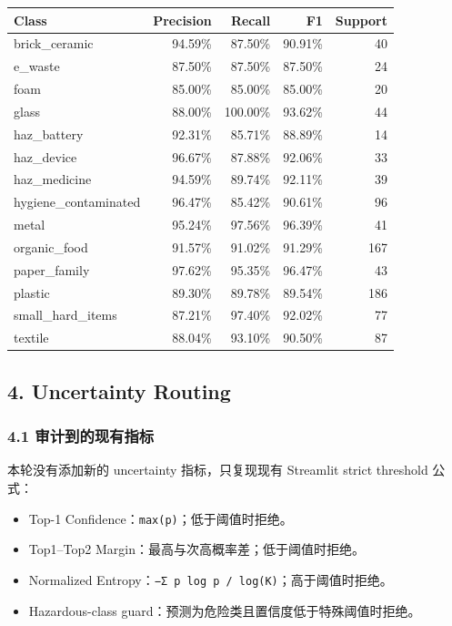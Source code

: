 \documentclass[
  a4paper,
]{article}
\providecommand{\tightlist}{%
  \setlength{\itemsep}{0pt}\setlength{\parskip}{0pt}}
\begin{document}
\begingroup
\small
\setlength{\tabcolsep}{3pt}
\begin{longtable}[]{@{}lrrrr@{}}
\toprule
Class & Precision & Recall & F1 & Support \\
\midrule
\endhead
brick\_ceramic & 94.59\% & 87.50\% & 90.91\% & 40 \\
e\_waste & 87.50\% & 87.50\% & 87.50\% & 24 \\
foam & 85.00\% & 85.00\% & 85.00\% & 20 \\
glass & 88.00\% & 100.00\% & 93.62\% & 44 \\
haz\_battery & 92.31\% & 85.71\% & 88.89\% & 14 \\
haz\_device & 96.67\% & 87.88\% & 92.06\% & 33 \\
haz\_medicine & 94.59\% & 89.74\% & 92.11\% & 39 \\
hygiene\_contaminated & 96.47\% & 85.42\% & 90.61\% & 96 \\
metal & 95.24\% & 97.56\% & 96.39\% & 41 \\
organic\_food & 91.57\% & 91.02\% & 91.29\% & 167 \\
paper\_family & 97.62\% & 95.35\% & 96.47\% & 43 \\
plastic & 89.30\% & 89.78\% & 89.54\% & 186 \\
small\_hard\_items & 87.21\% & 97.40\% & 92.02\% & 77 \\
textile & 88.04\% & 93.10\% & 90.50\% & 87 \\
\bottomrule
\end{longtable}
\endgroup

\hypertarget{4-uncertainty-routing}{%
\subsection{4. Uncertainty Routing}\label{4-uncertainty-routing}}

\hypertarget{41-ux5ba1ux8ba1ux5230ux7684ux73b0ux6709ux6307ux6807}{%
\subsubsection{4.1
审计到的现有指标}\label{41-ux5ba1ux8ba1ux5230ux7684ux73b0ux6709ux6307ux6807}}

本轮没有添加新的 uncertainty 指标，只复现现有 Streamlit strict threshold
公式：

\begin{itemize}
\tightlist
\item
  Top-1 Confidence：\texttt{max(p)}；低于阈值时拒绝。
\item
  Top1--Top2 Margin：最高与次高概率差；低于阈值时拒绝。
\item
  Normalized
  Entropy：\texttt{−Σ\ p\ log\ p\ /\ log(K)}；高于阈值时拒绝。
\item
  Hazardous-class guard：预测为危险类且置信度低于特殊阈值时拒绝。
\end{itemize}
\end{document}

